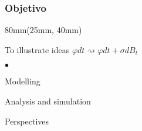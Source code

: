 \begin{frame}
    \frametitle{Objetivo}
    \begin{textblock*}{80mm}(25mm, 40mm)
            \begin{yellowbox}{%
                To illustrate ideas 
                $
                    \varphi dt 
                    \rightsquigarrow 
                    \varphi dt 
                    + 
                    \sigma dB_t
                $
            }
                \begin{list}{$\bullet$}{}
                    \item
                        Modelling
                    \item
                        Analysis and simulation 
                    \item
                        Perspectives
                \end{list}
            \end{yellowbox}
    \end{textblock*}
\end{frame}